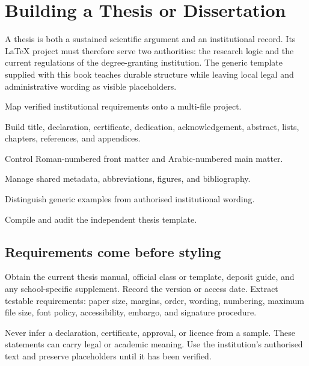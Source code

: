 \chapter{Building a Thesis or Dissertation}
\label{chap:thesis}

A thesis is both a sustained scientific argument and an institutional record.
Its \LaTeX{} project must therefore serve two authorities: the research logic and
the current regulations of the degree-granting institution. The generic
template supplied with this book teaches durable structure while leaving local
legal and administrative wording as visible placeholders.

\begin{learningoutcomes}
  \item Map verified institutional requirements onto a multi-file project.
  \item Build title, declaration, certificate, dedication, acknowledgement,
        abstract, lists, chapters, references, and appendices.
  \item Control Roman-numbered front matter and Arabic-numbered main matter.
  \item Manage shared metadata, abbreviations, figures, and bibliography.
  \item Distinguish generic examples from authorised institutional wording.
  \item Compile and audit the independent thesis template.
\end{learningoutcomes}

\section{Requirements come before styling}

Obtain the current thesis manual, official class or template, deposit guide,
and any school-specific supplement. Record the version or access date. Extract
testable requirements: paper size, margins, order, wording, numbering, maximum
file size, font policy, accessibility, embargo, and signature procedure.

\begin{submissioncheck}
Never infer a declaration, certificate, approval, or licence from a sample.
These statements can carry legal or academic meaning. Use the institution's
authorised text and preserve placeholders until it has been verified.
\end{submissioncheck}

